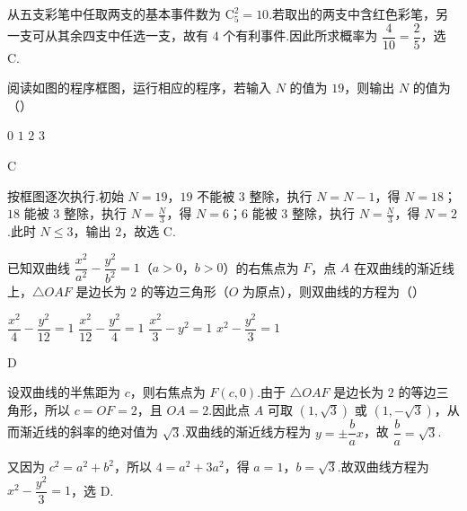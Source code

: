 \begin{solution}
从五支彩笔中任取两支的基本事件数为 \(\mathrm C_5^2=10\).若取出的两支中含红色彩笔，另一支可从其余四支中任选一支，故有 \(4\) 个有利事件.因此所求概率为 \(\dfrac{4}{10}=\dfrac25\)，选 C.
\end{solution}

\begin{problem}
阅读如图的程序框图，运行相应的程序，若输入 \(N\) 的值为 \(19\)，则输出 \(N\) 的值为（\quad）


\choices
    {\(0\)}
    {\(1\)}
    {\(2\)}
    {\(3\)}
\end{problem}

\begin{answer}
C
\end{answer}

\begin{solution}
按框图逐次执行.初始 \(N=19\)，\(19\) 不能被 \(3\) 整除，执行 \(N=N-1\)，得 \(N=18\)；\(18\) 能被 \(3\) 整除，执行 \(N=\frac{N}{3}\)，得 \(N=6\)；\(6\) 能被 \(3\) 整除，执行 \(N=\frac{N}{3}\)，得 \(N=2\).此时 \(N\le3\)，输出 \(2\)，故选 C.
\end{solution}

\begin{problem}
已知双曲线 \(\dfrac{x^2}{a^2}-\dfrac{y^2}{b^2}=1\)（\(a>0\)，\(b>0\)）的右焦点为 \(F\)，点 \(A\) 在双曲线的渐近线上，\(\triangle OAF\) 是边长为 \(2\) 的等边三角形（\(O\) 为原点），则双曲线的方程为（\quad）

\choices
    {\(\dfrac{x^2}{4}-\dfrac{y^2}{12}=1\)}
    {\(\dfrac{x^2}{12}-\dfrac{y^2}{4}=1\)}
    {\(\dfrac{x^2}{3}-y^2=1\)}
    {\(x^2-\dfrac{y^2}{3}=1\)}
\end{problem}

\begin{answer}
D
\end{answer}

\begin{solution}
设双曲线的半焦距为 \(c\)，则右焦点为 \(F(c,0)\).由于 \(\triangle OAF\) 是边长为 \(2\) 的等边三角形，所以 \(c=OF=2\)，且 \(OA=2\).因此点 \(A\) 可取 \((1,\sqrt3)\) 或 \((1,-\sqrt3)\)，从而渐近线的斜率的绝对值为 \(\sqrt3\).双曲线的渐近线方程为 \(y=\pm\dfrac ba x\)，故 \(\dfrac ba=\sqrt3\).

又因为 \(c^2=a^2+b^2\)，所以 \(4=a^2+3a^2\)，得 \(a=1\)，\(b=\sqrt3\).故双曲线方程为 \(x^2-\dfrac{y^2}{3}=1\)，选 D.
\end{solution}


